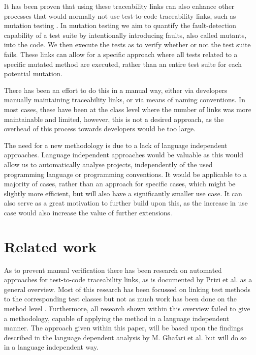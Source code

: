 \documentclass[11pt]{article}
\begin{document}
\begin{multicols}{2}
It has been proven that using these traceability links can also enhance other processes that would normally not use test-to-code traceability links, such as mutation testing \cite{10.1145/3278186.3278190}. In mutation testing we aim to quantify the fault-detection capability of a test suite by intentionally introducing faults, also called mutants, into the code. We then execute the tests as to verify whether or not the test suite fails. These links can allow for a specific approach where all tests related to a specific mutated method are executed, rather than an entire test suite for each potential mutation.

There has been an effort to do this in a manual way, either via developers manually maintaining traceability links, or via means of naming conventions. In most cases, these have been at the class level where the number of links was more maintainable and limited, however, this is not a desired approach, as the overhead of this process towards developers would be too large.

The need for a new methodology is due to a lack of language independent approaches. Language independent approaches would be valuable as this would allow us to automatically analyse projects, independently of the used programming language or programming conventions. It would be applicable to a majority of cases, rather than an approach for specific cases, which might be slightly more efficient, but will also have a significantly smaller use case. It can also serve as a great motivation to further build upon this, as the increase in use case would also increase the value of further extensions.

\section{Related work}
As to prevent manual verification there has been research on automated approaches for test-to-code traceability links, as is documented by Prizi et al. \cite{6862933} as a general overview. Most of this research has been focussed on linking test methods to the corresponding test classes \cite{10.1007/978-3-030-24305-0_40, 8823709, 6080780, 8452876, qusef2014recovering, van2009establishing} but not as much work has been done on the method level \cite{10.1007/978-3-540-73101-6_14, 7335402, hurdugaci2012aiding, white2020establishing}. Furthermore, all research shown within this overview failed to give a methodology, capable of applying the method in a language independent manner. The approach given within this paper, will be based upon the findings described in the language dependent analysis by M. Ghafari et al. \cite{7335402} but will do so in a language independent way.


\end{multicols}
\end{document}

